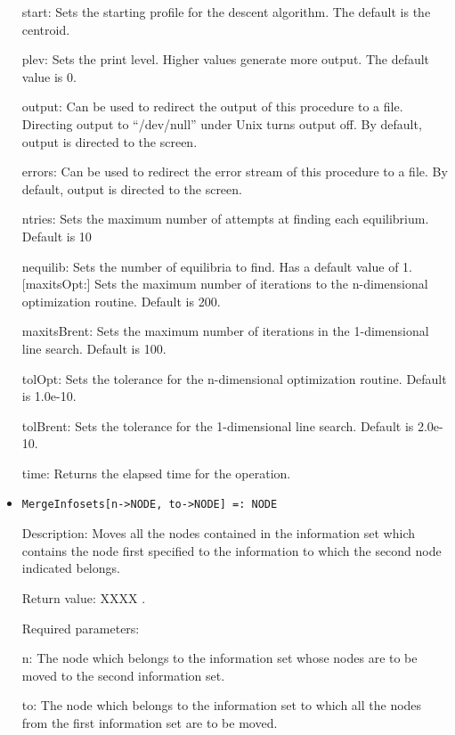 \begin{itemize}
\bd
\item
[start:] Sets the starting profile for the descent algorithm.  The
default is the centroid.
\item
[plev:] Sets the print level.  Higher values generate more output.
The default value is 0.
\item
[output:] Can be used to redirect the output of this procedure to a
file.  Directing output to ``/dev/null'' under Unix turns output off.
By default, output is directed to the screen.
\item
[errors:] Can be used to redirect the error stream of this procedure
to a file.  By default, output is directed to the screen.
\item
[ntries:] Sets the maximum number of attempts at finding each
equilibrium. Default is 10
\item
[nequilib:] Sets the number of equilibria to find.  Has a default
value of 1.  [maxitsOpt:] Sets the maximum number of iterations to the
n-dimensional optimization routine.  Default is 200.
\item
[maxitsBrent:] Sets the maximum number of iterations in the
1-dimensional line search.  Default is 100.
\item
[tolOpt:] Sets the tolerance for the n-dimensional optimization
routine.  Default is 1.0e-10.
\item
[tolBrent:] Sets the tolerance for the 1-dimensional line search.
Default is 2.0e-10.
\item
[time:] Returns the elapsed time for the operation.
\ed
\ed

\item
\protect \large \begin{verbatim}
MergeInfosets[n->NODE, to->NODE] =: NODE
\end{verbatim}\normalsize

\bd
\item
[Description:] Moves all the nodes contained in the information set
which contains the node first specified to the information to which
the second node indicated belongs.
\item
[Return value:] XXXX .
\item
[Required parameters:]\hfil\null

\bd
\item
[n:] The node which belongs to the information set whose nodes are to
be moved to the second information set.
\item
[to:] The node which belongs to the information set to which all the
nodes from the first information set are to be moved.
\ed


\end{itemize}

